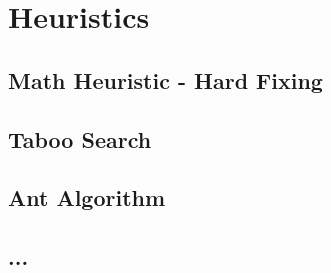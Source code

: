 
\chapter{Heuristics}
\label{chp:4-Heuristics}


\section{Math Heuristic - Hard Fixing}

\section{Taboo Search}

\section{Ant Algorithm}

\section{...}

